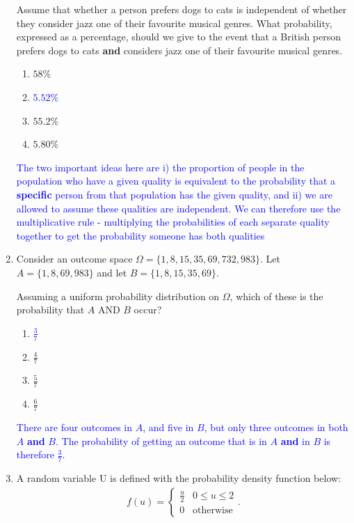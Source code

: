 \documentclass[11pt,a4paper]{article}
\begin{document}
\begin{question}
\begin{enumerate}
Assume that whether a person prefers dogs to cats is independent of whether they consider jazz one of their favourite musical genres. What probability, expressed as a percentage, should we give to the event that a British person prefers dogs to cats \textbf{and} considers jazz one of their favourite musical genres.
\begin{enumerate}
\item $58\%$
\item \textcolor{blue}{$5.52\%$}
\item $55.2\%$
\item $5.80\%$
\end{enumerate}
\textcolor{blue}{The two important ideas here are i) the proportion of people in the population who have a given quality is equivalent to the probability that a \textbf{specific} person from that population has the given quality, and ii) we are allowed to assume these qualities are independent. We can therefore use the multiplicative rule - multiplying the  probabilities of each separate quality together to get the probability someone has both qualities}

\item Consider an outcome space $\Omega=\{1,8,15,35,69,732,983\}$. Let $A=\{1,8,69,983\}$ and let $B=\{1,8,15,35,69\}$.

Assuming a uniform probability distribution on $\Omega$, which of these is the probability that $A$ AND $B$ occur?

\begin{enumerate}
\item \textcolor{blue}{$\frac{3}{7}$}
\item $\frac{4}{7}$
\item $\frac{5}{7}$
\item $\frac{6}{7}$
\end{enumerate}

\textcolor{blue}{There are four outcomes in $A$, and five in $B$, but only three outcomes in both $A$ \textbf{and} $B$. The probability of getting an outcome that is in $A$ \textbf{and} in $B$ is therefore $\frac{3}{7}$.}

\item A random variable U is defined with the probability density function below:
\begin{eqnarray*}
f(u)=\begin{cases} 
      \frac{u}{2} & 0\leq u \leq 2 \\
      0 & \text{otherwise}
   \end{cases}.
\end{eqnarray*}


\end{enumerate}
\end{question}
\end{document}
